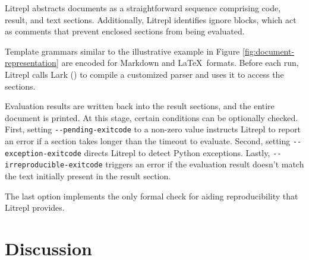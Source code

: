 \documentclass[letterpaper,12pt,twocolumn]{article}
\newcommand{\Latex}{\LaTeX\ }
\begin{document}
Litrepl abstracts documents as a straightforward sequence comprising code,
result, and text sections. Additionally, Litrepl identifies ignore blocks, which
act as comments that prevent enclosed sections from being evaluated.

Template grammars similar to the illustrative example in Figure
\ref{fig:document-representation} are encoded for Markdown and \Latex formats.
Before each run, Litrepl calls Lark (\textcite{Lark}) to compile a customized
parser and uses it to access the sections.

Evaluation results are written back into the result sections, and the entire
document is printed. At this stage, certain conditions can be optionally
checked. First, setting \verb|--pending-exitcode| to a non-zero value instructs
Litrepl to report an error if a section takes longer than the timeout to
evaluate. Second, setting \verb|--exception-exitcode| directs Litrepl to detect
Python exceptions. Lastly, \verb|--irreproducible-exitcode| triggers an error if
the evaluation result doesn't match the text initially present in the result
section.

The last option implements the only formal check for aiding reproducibility that
Litrepl provides.

\section{Discussion}
\end{document}
